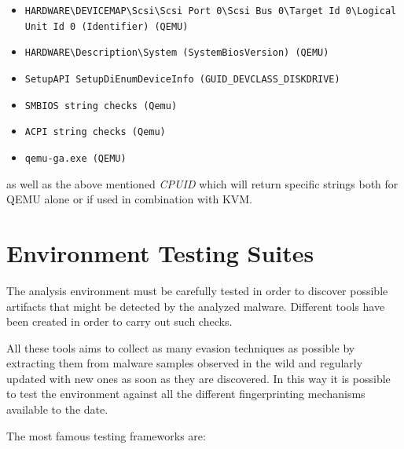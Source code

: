 \begin{itemize}
    \item \lstinline{HARDWARE\DEVICEMAP\Scsi\Scsi Port 0\Scsi Bus 0\Target Id 0\Logical Unit Id 0 (Identifier) (QEMU)}
    \item \lstinline{HARDWARE\Description\System (SystemBiosVersion) (QEMU)}
    \item \lstinline{SetupAPI SetupDiEnumDeviceInfo (GUID_DEVCLASS_DISKDRIVE)}
    \item \lstinline{SMBIOS string checks (Qemu)}
    \item \lstinline{ACPI string checks (Qemu)}
    \item \lstinline{qemu-ga.exe (QEMU)}
\end{itemize}

as well as the above mentioned \textit{CPUID} which will return specific strings both for QEMU alone or if used in combination with KVM.


\section{Environment Testing Suites}


The analysis environment must be carefully tested in order to discover possible artifacts that might be detected by the analyzed malware. Different tools have been created in order to carry out such checks. 

All these tools aims to collect as many evasion techniques as possible by extracting them from malware samples observed in the wild and regularly updated with new ones as soon as they are discovered. In this way it is possible to test the environment against all the different fingerprinting mechanisms available to the date. 

The most famous testing frameworks are: 

